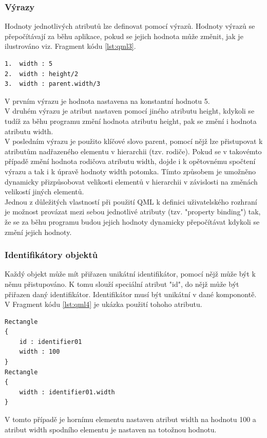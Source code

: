 \documentclass[report,11pt]{elsarticle}
\begin{document}
\subsubsection{Výrazy}
Hodnoty jednotlivých atributů lze definovat pomocí výrazů. Hodnoty výrazů se přepočítávají za běhu aplikace, pokud se jejich hodnota může změnit, jak je ilustrováno viz. Fragment kódu \ref{lst:qml3}.
\begin{lstlisting}[frame=single,caption=Několik ilustrativních příkladů formy výrazů.,label=lst:qml3]
1.	width : 5
2.	width : height/2
3.	width : parent.width/3
\end{lstlisting}
V prvním výrazu je hodnota nastavena na konstantní hodnotu 5.\\
V druhém výrazu je atribut nastaven pomocí jiného atributu height, kdykoli se tudíž za běhu programu změní hodnota atributu height, pak se změní i hodnota atributu width.\\
V posledním výrazu je použito klíčové slovo parent, pomocí nějž lze přistupovat k atributům nadřazeného elementu v hierarchii (tzv. rodiče). Pokud se v takovémto případě změní hodnota rodičova atributu width, dojde i k opětovnému spočtení výrazu a tak i k úpravě hodnoty width potomka. Tímto způsobem je umožněno dynamicky přizpůsobovat velikosti elementů v hierarchii v závislosti na změnách velikostí jiných elementů.\\
Jednou z důležitých vlastností při použití QML k definici uživatelského rozhraní je možnost provázat mezi sebou jednotlivé atributy (tzv. "property binding") tak, že se za běhu programu budou jejich hodnoty dynamicky přepočítávat kdykoli se změní jejich hodnoty.

\subsubsection{Identifikátory objektů}
Každý objekt může mít přiřazen unikátní identifikátor, pomocí nějž může být k němu přistupováno.  K tomu slouží speciální atribut "id", do nějž může být přiřazen daný identifikátor. Identifikátor musí být unikátní v dané komponontě. V Fragment kódu \ref{lst:qml4} je ukázka použití tohoho atributu.
\begin{lstlisting}[frame=single,caption=Ukázka použití atributu id.,label=lst:qml4]
Rectangle
{
	id : identifier01
	width : 100
}
Rectangle
{
	width : identifier01.width
}
\end{lstlisting}
V tomto případě je hornímu elementu nastaven atribut width na hodnotu 100 a atribut width spodního elementu je nastaven na totožnou hodnotu.
\end{document}
